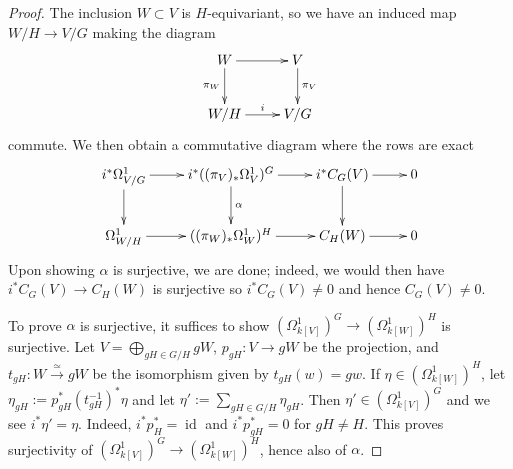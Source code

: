 \documentclass[10pt,a4paper]{amsart}
\DeclareMathOperator{\id}{id}
\begin{document}
\begin{proof}
    The inclusion $W\subset V$ is $H$-equivariant, so we have an induced map $W/H\to V/G$ making the diagram
    \[
        \xymatrix{
            W\ar[d]_-{\pi_W}\ar[r] & V\ar[d]^-{\pi_V}\\
            W/H\ar[r]^-{i} & V/G
        }
    \]
    commute. We then obtain a commutative diagram where the rows are exact
    \[
        \xymatrix{
            i^*\Omega^1_{V/G}\ar[r]\ar[d] & i^*((\pi_V)_*\Omega^1_V)^G\ar[d]^-{\alpha}\ar[r] & i^*C_G(V)\ar[r]\ar[d] & 0\\
            \Omega^1_{W/H}\ar[r] & ((\pi_W)_*\Omega^1_W)^H\ar[r] & C_H(W)\ar[r] & 0
        }
    \]
    Upon showing $\alpha$ is surjective, we are done; indeed, we would then have $i^*C_G(V)\to C_H(W)$ is surjective so $i^*C_G(V)\neq0$ and hence $C_G(V)\neq0$.

    To prove $\alpha$ is surjective, it suffices to show $(\Omega^1_{k[V]})^G\to(\Omega^1_{k[W]})^H$ is surjective. Let $V=\bigoplus_{gH\in G/H}gW$, $p_{gH}\colon V\to gW$ be the projection, and $t_{gH}\colon W\xrightarrow{\simeq} gW$ be the isomorphism given by $t_{gH}(w)=gw$. If $\eta\in(\Omega^1_{k[W]})^H$, let $\eta_{gH}:=p_{gH}^*(t_{gH}^{-1})^*\eta$ and let $\eta':=\sum_{gH\in G/H}\eta_{gH}$. Then $\eta'\in (\Omega^1_{k[V]})^G$ and we see $i^*\eta'=\eta$. Indeed, $i^*p_{H}^*=\id$ and $i^*p_{gH}^*=0$ for $gH\neq H$. This proves surjectivity of $(\Omega^1_{k[V]})^G\to(\Omega^1_{k[W]})^H$, hence also of $\alpha$.
\end{proof}
\end{document}
